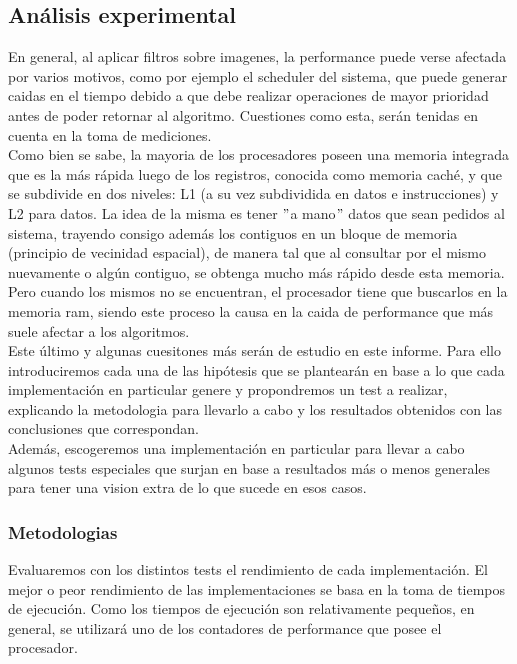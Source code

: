 \subsection{Análisis experimental}

En general, al aplicar filtros sobre imagenes, la performance puede verse afectada por varios motivos, como por ejemplo el scheduler del sistema, que puede generar caidas en el tiempo debido a que debe realizar operaciones de mayor prioridad antes de poder retornar al algoritmo. Cuestiones como esta, serán tenidas en cuenta en la toma de mediciones.\\

Como bien se sabe, la mayoria de los procesadores poseen una memoria integrada que es la más rápida luego de los registros, conocida como memoria caché, y que se subdivide en dos niveles: L1 (a su vez subdividida en datos e instrucciones) y L2 para datos. 
La idea de la misma es tener $"$a mano$"$ datos que sean pedidos al sistema, trayendo consigo además los contiguos en un bloque de memoria (principio de vecinidad espacial), de manera tal que al consultar por el mismo nuevamente o algún contiguo, se obtenga mucho más rápido desde esta memoria. Pero cuando los mismos no se encuentran, el procesador tiene que buscarlos en la memoria ram, siendo este proceso la causa en la caida de performance que más suele afectar a los algoritmos.\\ 

Este último y algunas cuesitones  más serán de estudio en este informe. Para ello introduciremos cada una de las hipótesis que se plantearán en base a lo que cada implementación en particular genere y propondremos un test a realizar, explicando la metodologia para llevarlo a cabo y los resultados obtenidos con las conclusiones que correspondan.\\
 
Además, escogeremos una implementación en particular para llevar a cabo algunos tests especiales que surjan en base a resultados más o menos generales para tener una vision extra de lo que sucede en esos casos.\\

\subsubsection{Metodologias}

Evaluaremos con los distintos tests el rendimiento de cada implementación. El mejor o peor rendimiento de las implementaciones se basa en la toma de tiempos de ejecución. Como los tiempos de ejecución son relativamente pequeños, en general, se utilizará uno de los contadores de performance que posee el procesador. \\

